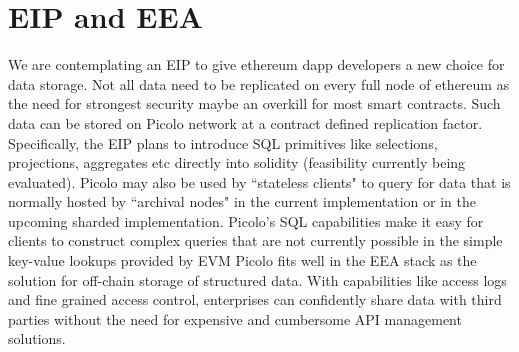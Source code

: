 \documentclass[preprint,12pt]{elsarticle}
\begin{document}
\section{EIP and EEA}
We are contemplating an EIP to give ethereum dapp developers a new choice for data storage. Not all data need to be replicated on every full node of ethereum as the need for strongest security maybe an overkill for most smart contracts. Such data can be stored on Picolo network at a contract defined replication factor. Specifically, the EIP plans to introduce SQL primitives like selections, projections, aggregates etc directly into solidity (feasibility currently being evaluated).
\newline
\newline
Picolo may also be used by ``stateless clients" to query for data that is normally hosted by ``archival nodes" in the current implementation or in the upcoming sharded implementation. Picolo's SQL capabilities make it easy for clients to construct complex queries that are not currently possible in the simple key-value lookups provided by EVM
\newline\newline
Picolo fits well in the EEA stack as the solution for off-chain storage of structured data. With capabilities like access logs and fine grained access control, enterprises can confidently share data with third parties without the need for expensive and cumbersome API management solutions.
\end{document}
